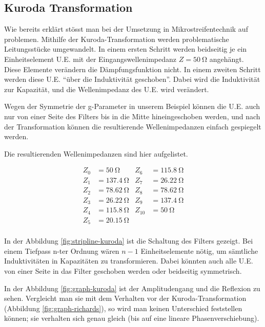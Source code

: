 \subsection{Kuroda Transformation}

Wie bereits erkl\"art st\"osst man bei der  Umsetzung  in Mikrostreifentechnik
auf  problemen.  Mithilfe  der  Kuroda-Transformation   werden  problematische
Leitungsst\"ucke umgewandelt. In einem ersten Schritt werden beidseitig je ein
Einheitselement  U.E.  mit  der  Eingangswellenimpedanz  $Z  =  \SI{50}{\ohm}$
angeh\"angt.  Diese Elemente ver\"andern  die  D\"ampfungsfunktion  nicht.  In
einem   zweiten   Schritt   werden  diese  U.E.  ``\"uber  die  Induktivit\"at
geschoben''.   Dabei  wird  die  Induktivit\"at  zur  Kapazit\"at,   und   die
Wellenimpedanz des U.E. wird ver\"andert.

Wegen der Symmetrie der g-Parameter in unserem Beispiel k\"onnen die U.E. auch
nur von einer Seite  des  Filters bis in die Mitte hineingeschoben werden, und
nach  der Transformation k\"onnen die resultierende  Wellenimpedanzen  einfach
gespiegelt werden.

Die resultierenden Wellenimpedanzen sind hier aufgelistet.

\begin{align*}
    Z_0  &= \SI{50}{\ohm}    & Z_6  &= \SI{115.8}{\ohm} \\
    Z_1  &= \SI{137.4}{\ohm} & Z_7  &= \SI{26.22}{\ohm} \\
    Z_2  &= \SI{78.62}{\ohm} & Z_8  &= \SI{78.62}{\ohm} \\
    Z_3  &= \SI{26.22}{\ohm} & Z_9  &= \SI{137.4}{\ohm} \\
    Z_4  &= \SI{115.8}{\ohm} & Z_10 &= \SI{50   }{\ohm} \\
    Z_5  &= \SI{20.15}{\ohm} &      &                   \\
\end{align*}

In der Abbildung \ref{fig:stripline-kuroda}  ist  die  Schaltung  des  Filters
gezeigt.  Bei  einem  Tiefpass  n-ter Ordnung w\"aren $n - 1$ Einheitselemente
n\"otig, um s\"amtliche Induktivit\"aten in  Kapazit\"aten  zu transformieren.
Dabei k\"onnten auch alle U.E. von einer  Seite in das Filter geschoben werden
oder beidseitig symmetrisch.

In  der  Abbildung  \ref{fig:graph-kuroda}  ist  der  Amplitudengang  und  die
Reflexion  zu  sehen.  Vergleicht  man  sie  mit   dem   Verhalten   vor   der
Kuroda-Transformation (Abbildung \ref{fig:graph-richards}), so wird man keinen
Unterschied  feststellen  k\"onnen;  sie verhalten sich genau gleich (bis  auf
eine lineare Phasenverschiebung).

